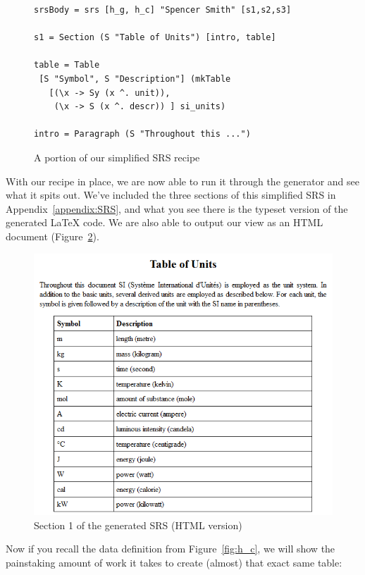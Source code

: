 \documentclass[preprint, 10pt]{sigplanconf}
\begin{document}
\begin{figure}[tb]
\begin{lstlisting}[frame=single, 
  showstringspaces=false, basicstyle=\scriptsize]
srsBody = srs [h_g, h_c] "Spencer Smith" [s1,s2,s3]

s1 = Section (S "Table of Units") [intro, table]

table = Table 
 [S "Symbol", S "Description"] (mkTable
   [(\x -> Sy (x ^. unit)),
    (\x -> S (x ^. descr)) ] si_units)

intro = Paragraph (S "Throughout this ...")
\end{lstlisting}
\caption{A portion of our simplified SRS recipe}
\label{fig:recipe}
\end{figure}

With our recipe in place, we are now able to run it through the generator and
see what it spits out. We've included the three sections of this simplified SRS
in Appendix~\ref{appendix:SRS}, and what you see there is the typeset version of
the generated LaTeX code. We are also able to output our view as an HTML
document (Figure~\ref{fig:HTML_s1}).

\begin{figure}
\includegraphics[scale=0.5]{HTML_s1.png}
\caption{Section 1 of the generated SRS (HTML version)}
\label{fig:HTML_s1}
\end{figure}

Now if you recall the data definition from Figure~\ref{fig:h_c}, we will show
the painstaking amount of work it takes to create (almost) that exact same
table:
\end{document}
